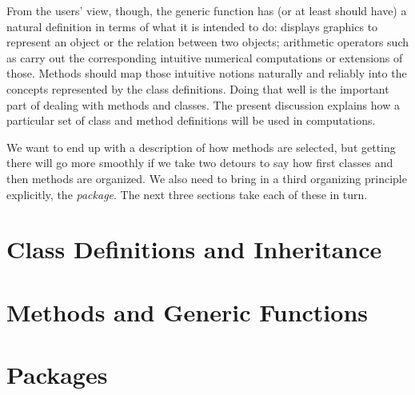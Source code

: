 \documentclass[11pt]{article}
\begin{document}
From the users' view, though, the generic function has (or at least should have) a natural definition in terms of what it is intended to do:   displays graphics to represent an object or the relation between two objects; arithmetic operators such as \SOperator{+} carry out the corresponding intuitive numerical computations or extensions of those.
Methods should map those intuitive notions naturally and reliably into the concepts represented by the class definitions.
Doing that well is the important part of dealing with methods and classes.
The present discussion explains how a particular set of class and method definitions will be used in computations.

We want to end up with a description of how methods are selected, but getting there will go more smoothly if we take two detours to say how first classes  and then  methods are organized.
We also need to bring in a third organizing principle explicitly, the \R{} \emph{package}.
The next three sections take each of these in turn.

\section{Class Definitions and Inheritance}
\label{sec:class-defin-inher}

\section{Methods and Generic Functions}
\label{sec:meth-gener-funct}

\section{Packages}
\label{sec:packages}
\end{document}
